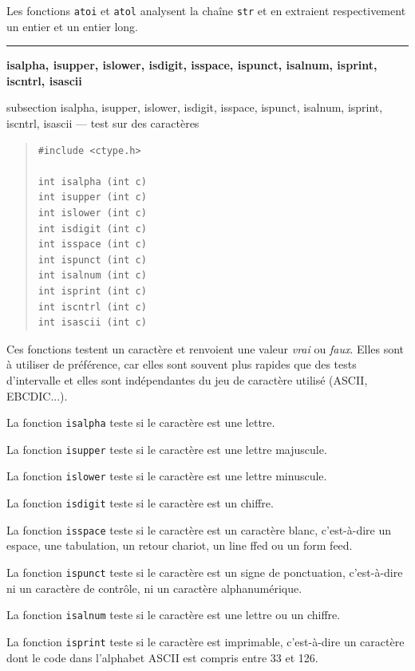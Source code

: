 \documentclass [twoside] {report}
\newcommand {\primitive} [1]
    {
	\phantomsection
	{\large \textbf {#1}}
	\addcontentsline {toc} {subsection} {#1}
    }
\newcommand {\separation}
    {
	\vspace {5mm}
	\nopagebreak
	\hrule
    }
\begin{document}
Les fonctions \texttt {atoi} et \texttt {atol} analysent la chaîne
\texttt {str} et en extraient respectivement un entier et un entier
long.


\separation 
\primitive {isalpha, isupper, islower, isdigit, isspace, ispunct, isalnum, \mbox {isprint}, iscntrl, isascii} --- test sur des caractères

\begin {quote}
\begin {verbatim}
#include <ctype.h>

int isalpha (int c)
int isupper (int c)
int islower (int c)
int isdigit (int c)
int isspace (int c)
int ispunct (int c)
int isalnum (int c)
int isprint (int c)
int iscntrl (int c)
int isascii (int c)
\end{verbatim}
\end {quote}

Ces fonctions testent un caractère et renvoient une valeur
\emph {vrai} ou \emph {faux}. Elles sont à utiliser de préférence, car
elles sont souvent plus rapides que des tests d'intervalle
et elles sont indépendantes du jeu de caractère utilisé
(ASCII, EBCDIC...).

La fonction \texttt {isalpha} teste si le caractère est une
lettre.

La fonction \texttt {isupper} teste si le caractère est une
lettre majuscule.

La fonction \texttt {islower} teste si le caractère est une
lettre minuscule.

La fonction \texttt {isdigit} teste si le caractère est un
chiffre.

La fonction \texttt {isspace} teste si le caractère est un
caractère blanc, c'est-à-dire un espace, une tabulation, un
retour chariot, un line ffed ou un form feed.

La fonction \texttt {ispunct} teste si le caractère est un
signe de ponctuation, c'est-à-dire ni un caractère de
contrôle, ni un caractère alphanumérique.

La fonction \texttt {isalnum} teste si le caractère est une
lettre ou un chiffre.

La fonction \texttt {isprint} teste si le caractère est
imprimable, c'est-à-dire un caractère dont le code dans
l'alphabet ASCII est compris entre 33 et 126.
\end{document}

